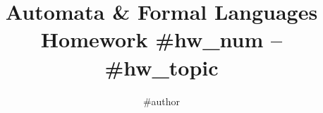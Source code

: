 \documentclass[fleqn]{article}
\title{Automata \& Formal Languages \\
\medskip
\large Homework #{hw_num} -- #{hw_topic}}
\author{#{author}}
\begin{document}
\maketitle

\begin{answers}

    \item

\end{answers}
\end{document}
